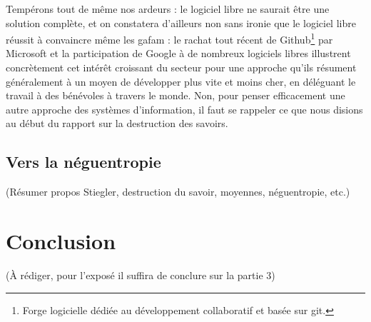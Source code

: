 \documentclass[a4paper,12pt]{report}
\begin{document}
Tempérons tout de même nos ardeurs : le logiciel libre ne saurait être une solution complète, et on constatera d'ailleurs non sans ironie que le logiciel libre réussit à convaincre même les \gls{gafam} : le rachat tout récent de Github\footnote{Forge logicielle dédiée au développement collaboratif et basée sur git.} par Microsoft et la participation de Google à de nombreux logiciels libres illustrent concrètement cet intérêt croissant du secteur pour une approche qu'ils résument généralement à un moyen de développer plus vite et moins cher, en déléguant le travail à des bénévoles à travers le monde. Non, pour penser efficacement une autre approche des systèmes d'information, il faut se rappeler ce que nous disions au début du rapport sur la destruction des savoirs.

\section{Vers la néguentropie}

(Résumer propos Stiegler, destruction du savoir, moyennes, néguentropie, etc.)

\chapter*{Conclusion}

(À rédiger, pour l'exposé il suffira de conclure sur la partie 3)




\newpage
\printglossary
\newpage
\printglossary[type=\acronymtype]
\end{document}
